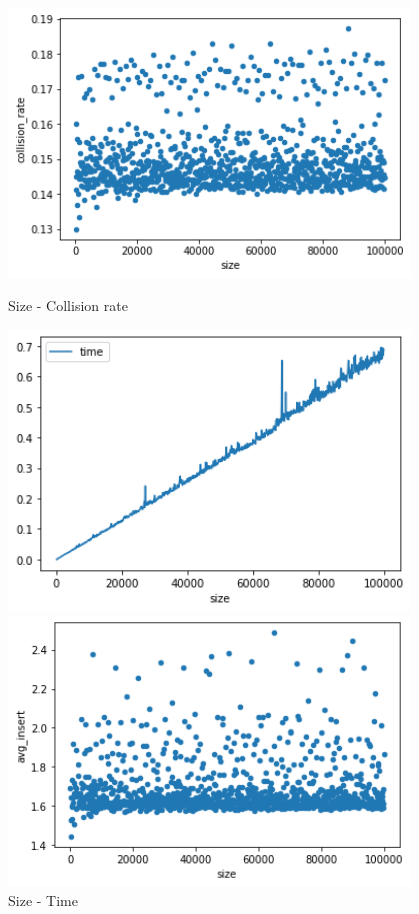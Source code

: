 \documentclass[a4]{article}
\begin{document}
\begin{figure}[H]
    \begin{minipage}{0.48\textwidth}
    \includegraphics[width=0.95\textwidth]{h-size-collision.png}
    \caption{Size - Collision rate}
    \end{minipage}
    \begin{minipage}{0.48\textwidth}
    \includegraphics[width=0.95\textwidth]{h-size-time.png}
    \caption{Size - Time}
    \end{minipage}
    \begin{minipage}{0.48\textwidth}
    \includegraphics[width=0.95\textwidth]{h-size-insert.png}

\end{minipage}
\end{figure}
\end{document}
